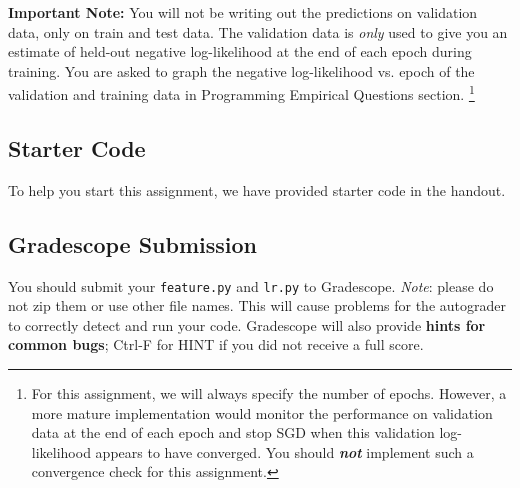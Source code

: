 \documentclass[11pt,addpoints,answers]{exam}
\begin{document}
\begin{notebox}
{\bf Important Note:} You will not be writing out the predictions on validation data, only on train and test data. The validation data is \emph{only} used to give you an estimate of held-out negative log-likelihood at the end of each epoch during training. You are asked to graph the negative log-likelihood vs. epoch of the validation and training data in Programming Empirical Questions section. \footnote{For this assignment, we will always specify the number of epochs. However, a more mature implementation would monitor the performance on validation data at the end of each epoch and stop SGD when this validation log-likelihood appears to have converged. You should \textbf{\emph{not}} implement such a convergence check for this assignment.} 
\end{notebox}

\subsection{Starter Code}\label{startercode}

To help you start this assignment, we have provided starter code in the handout.



\subsection{Gradescope Submission }
You should submit your \texttt{feature.py} and \texttt{lr.py} to Gradescope.
\textit{Note}: please do not zip them or use other file names. This will cause problems for the autograder to correctly detect and run your code. Gradescope will also provide \textbf{hints for common bugs}; Ctrl-F for HINT if you did not receive a full score.
\newpage
\end{document}
